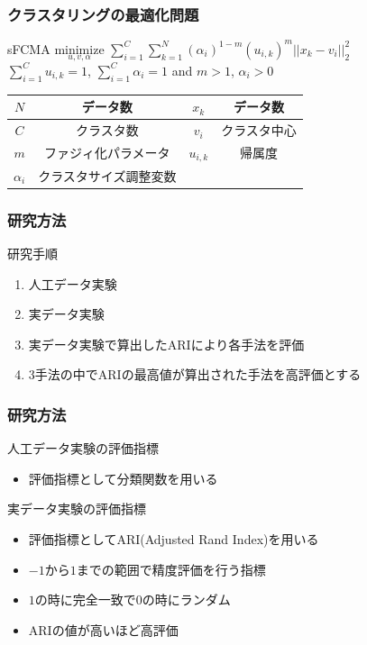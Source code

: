 \documentclass[13pt,dvipdfmx]{beamer}
\begin{document}
\begin{frame}\frametitle{クラスタリングの最適化問題}
  \begin{block}{sFCMA}
    \quad$\underset{u,v,\alpha}{\text{minimize}}$
    $\sum_{i=1}^C\sum_{k=1}^N(\alpha_{i})^{1-m}(u_{i,k})^m||x_k-v_i||_2^2$\\
    \qquad\qquad{}$\sum_{i=1}^Cu_{i,k}=1$\;, \;$\sum_{i=1}^C\alpha_{i}=1$\; and \;$m>1$\;, \;$\alpha_{i}>0$
  \end{block}
  \begin{center}
    \begin{tabular}{c|c||c|c} \hline
	  {$N$}&データ数&{$x_k$}&データ数 \\ \hline
	  {$C$}&クラスタ数&{$v_i$}&クラスタ中心\\ \hline
	  {$m$}&ファジィ化パラメータ&{$u_{i,k}$}&帰属度 \\ \hline
	  {$\alpha_i$}&クラスタサイズ調整変数\\ \hline
    \end{tabular}
  \end{center}
\end{frame}

\begin{frame}\frametitle{研究方法}
 \begin{block}{研究手順}
   \begin{enumerate}
    \item 人工データ実験
    \item 実データ実験
    \item 実データ実験で算出したARIにより各手法を評価
    \item 3手法の中でARIの最高値が算出された手法を高評価とする
   \end{enumerate}
  \end{block}
\end{frame}

\begin{frame}\frametitle{研究方法}
 \begin{block}{人工データ実験の評価指標}
  \begin{itemize}
   \item 評価指標として分類関数を用いる
  \end{itemize}
 \end{block}
 \begin{block}{実データ実験の評価指標}
  \begin{itemize}
   \item 評価指標としてARI(Adjusted Rand Index)を用いる
   \item $-1$から$1$までの範囲で精度評価を行う指標
   \item $1$の時に完全一致で$0$の時にランダム
   \item ARIの値が高いほど高評価
  \end{itemize}
 \end{block}
\end{frame}
\end{document}
